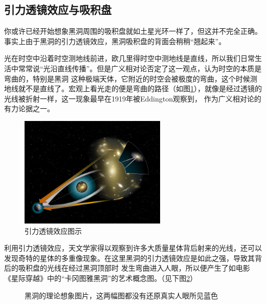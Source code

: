 \documentclass{ctexart}
\begin{document}
    \subsection{引力透镜效应与吸积盘}
    你或许已经开始想象黑洞周围的吸积盘就如土星光环一样了，但这并不完全正确。事实上由于黑洞的引力透镜效应，黑洞吸积盘的背面会稍稍“翘起来”。\cite{fukue1988color}

    光在时空中沿着时空测地线前进，欧几里得时空中测地线是直线，所以我们日常生活中常常说“光沿直线传播”。但是广义相对论否定了这一观点，认为时空的本质是弯曲的，特别是黑洞
    这种极端天体，它附近的时空会被极度的弯曲，这个时候测地线就不是直线了。宏观上看光走的便是弯曲的路径（如图\ref{fig:2}），就像是经过透镜的光线被折射一样，这一现象最早在1919年被Eddington观察到，
    作为广义相对论的有力论据之一。
    \begin{figure}[H]
        \centering
        \includegraphics[width=7cm]{figs/Gravitational_lens-full.jpg}
        \caption{引力透镜效应图示}
        \label{fig:2}
    \end{figure}

    利用引力透镜效应，天文学家得以观察到许多大质量星体背后射来的光线，还可以发现奇特的星体的多重像现象。在这里黑洞的引力透镜效应是如此之强，导致其背后的吸积盘的光线在经过黑洞顶部时
    发生弯曲进入人眼，所以便产生了如电影《星际穿越》中的“卡冈图雅黑洞”的艺术概念图。（见下图\ref{fig:3}）
    \begin{figure}[H]
        \centering
        \caption{黑洞的理论想象图片，这两幅图都没有还原真实人眼所见蓝色}
        \label{fig:3}
    \end{figure}
\end{document}
